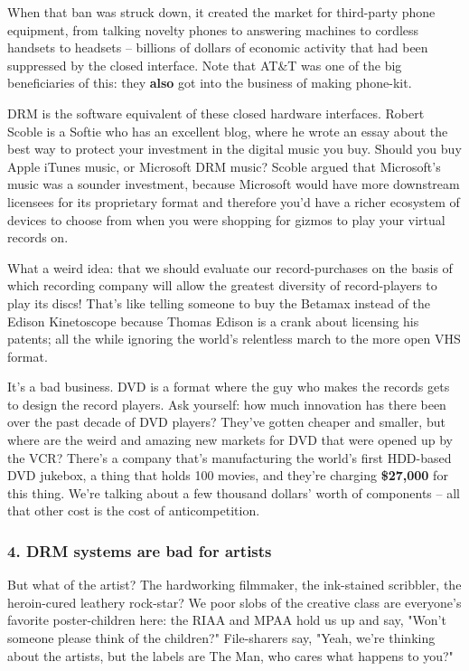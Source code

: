 When that ban was struck down, it created the market for
third-party phone equipment, from talking novelty phones to
answering machines to cordless handsets to headsets -- billions of
dollars of economic activity that had been suppressed by the closed
interface. Note that AT\&T was one of the big beneficiaries of
this: they \textbf{also} got into the business of making
phone-kit.

DRM is the software equivalent of these closed hardware interfaces.
Robert Scoble is a Softie who has an excellent blog, where he wrote
an essay about the best way to protect your investment in the
digital music you buy. Should you buy Apple iTunes music, or
Microsoft DRM music? Scoble argued that Microsoft's music was a
sounder investment, because Microsoft would have more downstream
licensees for its proprietary format and therefore you'd have a
richer ecosystem of devices to choose from when you were shopping
for gizmos to play your virtual records on.

What a weird idea: that we should evaluate our record-purchases on
the basis of which recording company will allow the greatest
diversity of record-players to play its discs! That's like telling
someone to buy the Betamax instead of the Edison Kinetoscope
because Thomas Edison is a crank about licensing his patents; all
the while ignoring the world's relentless march to the more open
VHS format.

It's a bad business. DVD is a format where the guy who makes the
records gets to design the record players. Ask yourself: how much
innovation has there been over the past decade of DVD players?
They've gotten cheaper and smaller, but where are the weird and
amazing new markets for DVD that were opened up by the VCR? There's
a company that's manufacturing the world's first HDD-based DVD
jukebox, a thing that holds 100 movies, and they're charging
\textbf{\$27,000} for this thing. We're talking about a few
thousand dollars' worth of components -- all that other cost is the
cost of anticompetition.

\subsubsection{4. DRM systems are bad for artists}

But what of the artist? The hardworking filmmaker, the ink-stained
scribbler, the heroin-cured leathery rock-star? We poor slobs of
the creative class are everyone's favorite poster-children here:
the RIAA and MPAA hold us up and say, "Won't someone please think
of the children?" File-sharers say, "Yeah, we're thinking about the
artists, but the labels are The Man, who cares what happens to
you?"

